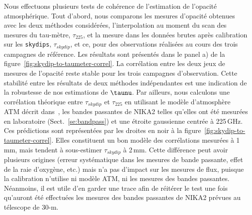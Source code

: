 Nous effectuons plusieurs tests de cohérence de l'estimation de
l'opacité atmosphérique. Tout d'abord, nous comparons les mesures
d'opacité obtenues avec les deux méthodes considérées, l'interpolation
au moment du scan des mesures du tau-mètre, $\tau_{225}$, et la mesure
dans les données brutes après calibration sur les {\tt skydips},
$\tau_{skydip}$, et ce, pour des observations réalisées au cours des
trois campagnes de référence. Les résultats sont présentés dans le
panel a) de la figure~\ref{fig:skydip-to-taumeter-correl}. La
corrélation entre les deux jeux de mesures de l'opacité reste stable
pour les trois campagnes d'observation. Cette stabilité entre les
résultats de deux méthodes indépendantes est une indication de la
robustesse de nos estimations de $\taunu$. Par ailleurs, nous
calculons une corrélation théorique entre $\tau_{skydip}$ et
$\tau_{225}$ en utilisant le modèle d'atmosphère ATM décrit
dans~\citet{Pardo2001}, les bandes passantes de NIKA2 telles qu'elles
ont été mesurées en laboratoire (Sect.~\ref{se:bandpass}) et une
étroite gaussienne centrée à 225\,GHz. Ces prédictions sont
représentées par les droites en noir à la
figure~\ref{fig:skydip-to-taumeter-correl}. Elles constituent un bon
modèle des corrélations mesurées à 1\,mm, mais tendent à sous-estimer
$\tau_{skydip}$ à 2\,mm. Cette différence peut avoir plusieurs
origines (erreur systématique dans les mesures de bande passante,
effet de la raie d'oxygène, etc.) mais n'a pas d'impact sur les
mesures de flux, puisque la calibration n'utilise ni modèle ATM, ni
les mesures des bandes passantes. Néanmoins, il est utile d'en garder
une trace afin de réitérer le test une fois qu'auront été effectuées
les mesures des bandes passantes de NIKA2 prévues au télescope de
30-m.
%
